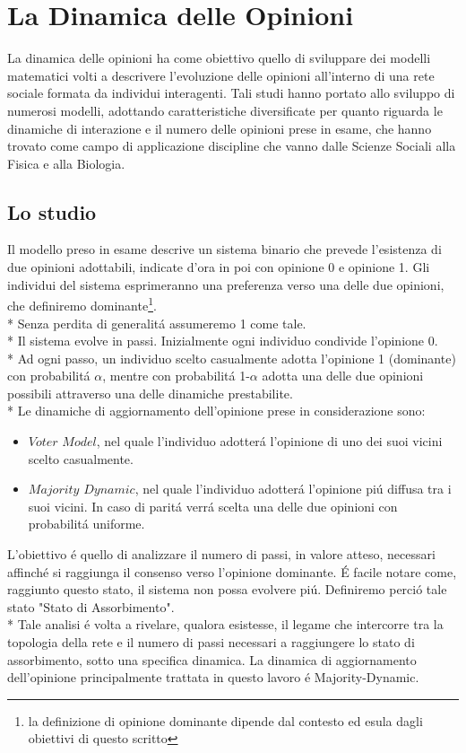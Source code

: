 \documentclass[../Tesi.tex]{subfiles}
\begin{document}
\chapter{La Dinamica delle Opinioni}
La dinamica delle opinioni ha come obiettivo quello di sviluppare dei modelli matematici volti a descrivere l'evoluzione delle opinioni all'interno di una rete sociale formata da individui interagenti.
Tali studi hanno portato allo sviluppo di numerosi modelli, adottando caratteristiche diversificate per quanto riguarda le dinamiche di interazione e il numero delle opinioni prese in esame, che hanno trovato come campo di applicazione discipline che vanno dalle Scienze Sociali alla Fisica e alla Biologia.
\section{Lo studio}
Il modello preso in esame descrive un sistema binario che prevede l'esistenza di due opinioni adottabili, indicate d'ora in poi con opinione 0 e opinione 1. Gli individui del sistema esprimeranno una preferenza verso una delle due opinioni, che definiremo  dominante\footnote{la definizione di opinione dominante dipende dal contesto ed esula dagli obiettivi di questo scritto}.\\*
Senza perdita di generalit\'a assumeremo 1 come tale.\\*
Il sistema evolve in passi. Inizialmente ogni individuo condivide l'opinione 0.\\*
Ad ogni passo, un individuo scelto casualmente adotta l'opinione 1 (dominante) con probabilit\'a $\alpha$, mentre con probabilit\'a 1-$\alpha$ adotta una delle due opinioni possibili attraverso una delle dinamiche prestabilite.\\*
Le dinamiche di aggiornamento dell'opinione prese in considerazione sono:
\begin{itemize}
\item $Voter$ $Model$, nel quale l'individuo adotter\'a l'opinione di uno dei suoi vicini scelto casualmente.
\item $Majority$ $Dynamic$, nel quale l'individuo adotter\'a l'opinione pi\'u diffusa tra i suoi vicini. In caso di parit\'a verr\'a scelta una delle due opinioni con probabilit\'a uniforme.
\end{itemize}
L'obiettivo \'e quello di analizzare il numero di passi, in valore atteso, necessari affinch\'e si raggiunga il consenso verso l'opinione dominante. \'E facile notare come, raggiunto questo stato, il sistema non possa evolvere pi\'u. Definiremo perci\'o tale stato "Stato di Assorbimento".\\*
Tale analisi \'e volta a rivelare, qualora esistesse, il legame che intercorre tra la topologia della rete e il numero di passi necessari a raggiungere lo stato di assorbimento, sotto una specifica dinamica.
La dinamica di aggiornamento dell'opinione principalmente trattata in questo lavoro \'e Majority-Dynamic.
\end{document}
